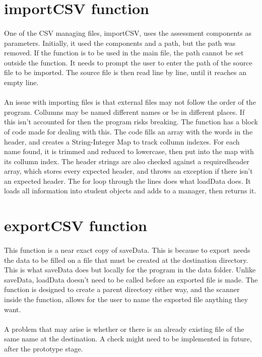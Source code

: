\section{importCSV function}
\paragraph{}
One of the CSV managing files, importCSV, uses the assessment components as parameters. 
Initially, it used the components and a path, but the path was removed. If the 
function is to be used in the main file, the path cannot be set outside the function. 
It needs to prompt the user to enter the path of the source file to be imported. 
The source file is then read line by line, until it reaches an empty line.

\paragraph{}
An issue with importing files is that external files may not follow the order of the program.
Collumns may be named different names or be in different places. If this isn't accounted for then the program risks breaking.
The function has a block of code made for dealing with this. The code 
fills an array with the words in the header, and creates a String-Integer Map 
to track collumn indexes. For each name found, it is trimmed and reduced to lowercase, then put into the map with its collumn index. 
The header strings are also checked against a requiredheader array, which stores every expected header,
and throws an exception if there isn't an expected header.
The for loop through the lines does what loadData does. It loads all information into 
student objects and adds to a manager, then returns it. 

\section{exportCSV function}
\paragraph{}
This function is a near exact copy of saveData. This is because to export\
needs the data to be filled on a file that must be created at the destination directory.
This is what saveData does but locally for the program in the data folder.
Unlike saveData, loadData doesn't need to be called before an exported file is made.
The function is designed to create a parent directory either way, and the scanner inside the function, 
allows for the user to name the exported file anything they want.

\paragraph{}
A problem that may arise is whether or there is an already existing file of the same name 
at the destination. A check might need to be implemented in future, after the prototype stage.
 